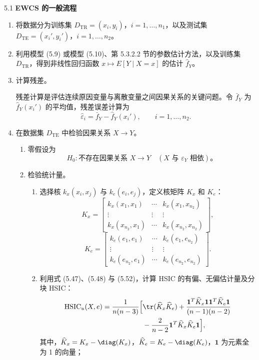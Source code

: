 \begin{bookalgorithm}{5.1}
\textbf{EWCS 的一般流程}
\begin{enumerate}
\item 将数据分为训练集 $D_{\mathrm{TR}}=(x_i,y_i)$，$i=1,\ldots,n_1$，以及测试集 $D_{\mathrm{TE}}=(x_i',y_i')$，$i=1,\ldots,n_2$。
\item 利用模型 (5.9) 或模型 (5.10)、第 5.3.2.2 节的参数估计方法，以及训练集 $D_{\mathrm{TR}}$，得到非线性回归函数 $x\mapsto E[Y\mid X=x]$ 的估计 $\widehat f_Y$。
\item 计算残差。

残差计算是评估连续原因变量与离散变量之间因果关系的关键问题。令 $\bar f_Y$ 为 $\widehat f_Y(x_i')$ 的平均值，残差误差计算为
\[
\widehat\varepsilon_i=\bar f_Y-\widehat f_Y(x_i'),\qquad i=1,\ldots,n_2.
\]
\item 在数据集 $D_{\mathrm{TE}}$ 中检验因果关系 $X\to Y$。
\begin{enumerate}[label=(\alph*)]
\item 零假设为
\[
H_0:\text{不存在因果关系 }X\to Y\quad(X\text{ 与 }\varepsilon_Y\text{ 相依})\text{。}
\]
\item 检验统计量。
\begin{enumerate}[label=(\roman*)]
\item 选择核 $k_x(x_i,x_j)$ 与 $k_e(e_i,e_j)$，定义核矩阵 $K_x$ 和 $K_e$：
\[
K_x=\begin{bmatrix}
k_x(x_1,x_1)&\cdots&k_x(x_1,x_{n_2})\\
\vdots&\vdots&\vdots\\
k_x(x_{n_2},x_1)&\cdots&k_x(x_{n_2},x_{n_2})
\end{bmatrix},
\]
\[
K_e=\begin{bmatrix}
k_e(e_1,e_1)&\cdots&k_e(e_1,e_{n_2})\\
\vdots&\vdots&\vdots\\
k_e(e_{n_2},e_1)&\cdots&k_e(e_{n_2},e_{n_2})
\end{bmatrix}.
\]
\item 利用式 (5.47)、(5.48) 与 (5.52)，计算 HSIC 的有偏、无偏估计量及分块 HSIC：
\[
\begin{aligned}
\mathrm{HSIC}_u(X,e)=\frac1{n(n-3)}\Bigl[{}&\tr(\widehat K_x\widehat K_e)
+\frac{\mathbf1^T\widehat K_x\mathbf1\mathbf1^T\widehat K_e\mathbf1}{(n-1)(n-2)}\\
&-\frac2{n-2}\mathbf1^T\widehat K_x\widehat K_e\mathbf1\Bigr],
\end{aligned}
\]
其中，$\widehat K_x=K_x-\diag(K_x)$，$\widehat K_e=K_e-\diag(K_e)$，$\mathbf1$ 为元素全为 1 的向量；

\end{enumerate}
\end{enumerate}
\end{enumerate}
\end{bookalgorithm}
